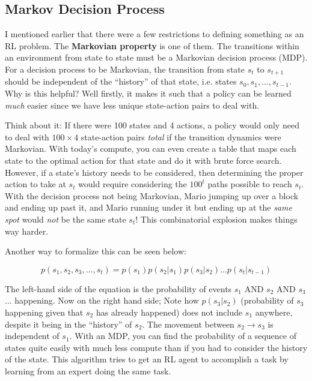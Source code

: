 \subsection{Markov Decision Process}
\begin{flushleft}
    \large I mentioned earlier that there were a few restrictions to defining something as an RL problem. The \textbf{Markovian property} is one of them. The transitions within an environment from state to state must be a Markovian decision process (MDP). For a decision process to be Markovian, the transition from state $s_t$ to $s_{t+1}$ should be independent of the ``history'' of that state, i.e. states $s_0, s_1,...,s_{t-1}$. Why is this helpful? Well firstly, it makes it such that a policy can be learned \textit{much} easier since we have less unique state-action pairs to deal with. \break
    
    Think about it: If there were 100 states and 4 actions, a policy would only need to deal with $100 \times 4$ state-action pairs \textit{total} if the transition dynamics were Markovian. With today's compute, you can even create a table that maps each state to the optimal action for that state and do it with brute force search. However, if a state's history needs to be considered, then determining the proper action to take at $s_t$ would require considering the $100^t$ paths possible to reach $s_t$. With the decision process not being Markovian, Mario jumping up over a block and ending up past it, and Mario running under it but ending up at the \textit{same spot} would \textit{not} be the same state $s_t$! This combinatorial explosion makes things way harder. \break

    Another way to formalize this can be seen below:

    $$p(s_1, s_2, s_3,...,s_t) = p(s_1)p(s_2|s_1)p(s_3|s_2)...p(s_t|s_{t-1})$$

    The left-hand side of the equation is the probability of events $s_1$ AND $s_2$ AND $s_3$... happening. Now on the right hand side; Note how $p(s_3|s_2)$ (probability of $s_3$ happening given that $s_2$ has already happened) does not include $s_1$ anywhere, despite it being in the ``history'' of $s_2$. The movement between $s_2 \rightarrow s_3$ is independent of $s_1$. With an MDP, you can find the probability of a sequence of states quite easily with much less compute than if you had to consider the history of the state. This algorithm tries to get an RL agent to accomplish a task by learning from an expert doing the same task.  \break


\end{flushleft}
